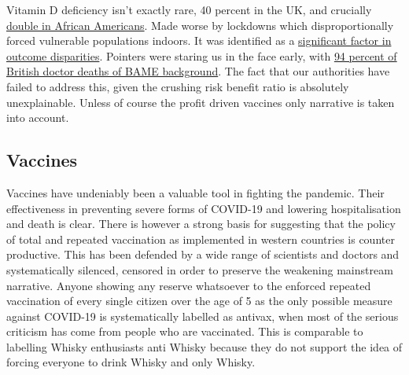 \documentclass[11pt,a4paper]{article}
\begin{document}
Vitamin D deficiency isn't exactly rare, 40 percent in the UK, and crucially \href{https://www.cooperinstitute.org/2019/09/24/african-americans-at-greatest-risk-of-vitamin-d-deficiency}{double in African Americans}. Made worse by lockdowns which disproportionally forced vulnerable populations indoors. It was identified as a \href{https://pubmed.ncbi.nlm.nih.gov/33546262/}{significant factor in outcome disparities}. Pointers were staring us in the face early, with \href{https://twitter.com/TheBMA/status/1271768163630428160?s=20}{94 percent of British doctor deaths of BAME background}. The fact that our authorities have failed to address this, given the crushing risk benefit ratio is absolutely unexplainable. Unless of course the profit driven vaccines only narrative is taken into account. 

\subsection*{Vaccines}

Vaccines have undeniably been a valuable tool in fighting the pandemic. Their effectiveness in preventing severe forms of COVID-19 and lowering hospitalisation and death is clear. There is however a strong basis for suggesting that the policy of total and repeated vaccination as implemented in western countries is counter productive. This has been defended by a wide range of scientists and doctors and systematically silenced, censored in order to preserve the weakening mainstream narrative. Anyone showing any reserve whatsoever to the enforced repeated vaccination of every single citizen over the age of 5 as the only possible measure against COVID-19 is systematically labelled as antivax, when most of the serious criticism has come from people who are vaccinated. This is comparable to labelling Whisky enthusiasts anti Whisky because they do not support the idea of forcing everyone to drink Whisky and only Whisky.
\end{document}
